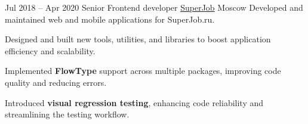 \cventry
{Jul 2018 – Apr 2020}
{Senior Frontend developer}
{\href{https://superjob.ru}{SuperJob}}
{Moscow}
{}
{Developed and maintained web and mobile applications for SuperJob.ru.}

\cvlistitem
{Designed and built new tools, utilities, and libraries to boost application efficiency and scalability.}

\cvlistitem
{Implemented \textbf{FlowType} support across multiple packages, improving code quality and reducing errors.}

\cvlistitem
{Introduced \textbf{visual regression testing}, enhancing code reliability and streamlining the testing workflow.}
